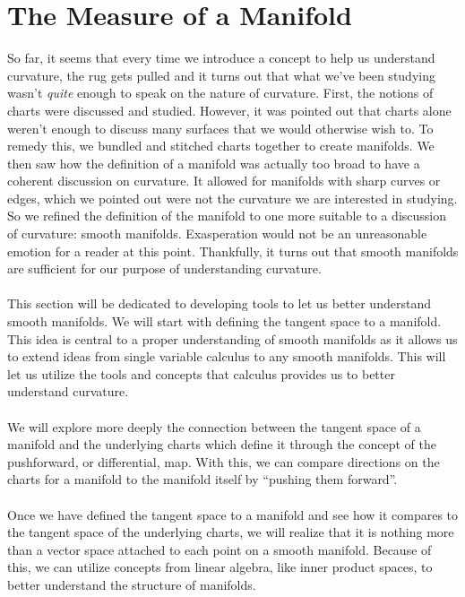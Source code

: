 \documentclass[]{article}
\newcommand\<{\ensuremath{\left\langle}}
\renewcommand\>{\ensuremath{\right\rangle}}
\theoremstyle{definition}
\theoremstyle{definition}
\begin{document}
	\section{The Measure of a Manifold}
	So far, it seems that every time we introduce a concept to help us understand curvature, the rug gets pulled and it turns out that what we've been studying wasn't \textit{quite} enough to speak on the nature of curvature. First, the notions of charts were discussed and studied. However, it was pointed out that charts alone weren't enough to discuss many surfaces that we would otherwise wish to. To remedy this, we bundled and stitched charts together to create manifolds. We then saw how the definition of a manifold was actually too broad to have a coherent discussion on curvature. It allowed for manifolds with sharp curves or edges, which we pointed out were not the curvature we are interested in studying. So we refined the definition of the manifold to one more suitable to a discussion of curvature: smooth manifolds. Exasperation would not be an unreasonable emotion for a reader at this point. Thankfully, it turns out that smooth manifolds are sufficient for our purpose of understanding curvature.\\
	\\
	This section will be dedicated to developing tools to let us better understand smooth manifolds. We will start with defining the tangent space to a manifold. This idea is central to a proper understanding of smooth manifolds as it allows us to extend ideas from single variable calculus to any smooth manifolds. This will let us utilize the tools and concepts that calculus provides us to better understand curvature.\\
	\\
	We will explore more deeply the connection between the tangent space of a manifold and the underlying charts which define it through the concept of the pushforward, or differential, map. With this, we can compare directions on the charts for a manifold to the manifold itself by ``pushing them forward''. \\
	\\
	Once we have defined the tangent space to a manifold and see how it compares to the tangent space of the underlying charts, we will realize that it is nothing more than a vector space attached to each point on a smooth manifold. Because of this, we can utilize concepts from linear algebra, like inner product spaces, to better understand the structure of manifolds.
	
\end{document}
